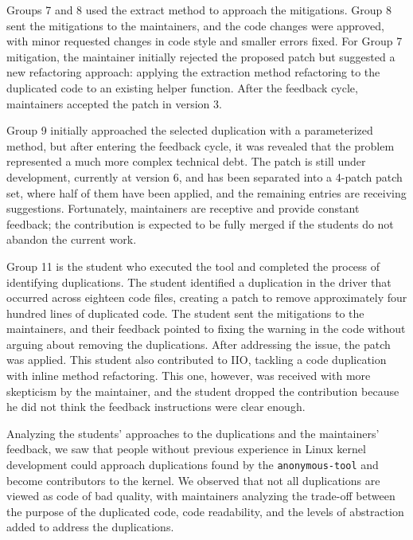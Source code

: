 \documentclass[10pt,conference]{IEEEtran}
\begin{document}

Groups 7 and 8 used the extract method to approach the mitigations. Group 8 sent the mitigations to the maintainers, and the code changes were approved, with minor requested changes in code style and smaller errors fixed. For Group 7 mitigation, the maintainer initially rejected the proposed patch but suggested a new refactoring approach: applying the extraction method refactoring to the duplicated code to an existing helper function. After the feedback cycle, maintainers accepted the patch in version 3.

Group 9 initially approached the selected duplication with a parameterized method, but after entering the feedback cycle, it was revealed that the problem represented a much more complex technical debt. The patch is still under development, currently at version 6, and has been separated into a 4-patch patch set, where half of them have been applied, and the remaining entries are receiving suggestions. Fortunately, maintainers are receptive and provide constant feedback; the contribution is expected to be fully merged if the students do not abandon the current work.

Group 11 is the student who executed the tool and completed the process of identifying duplications. The student identified a duplication in the driver that occurred across eighteen code files, creating a patch to remove approximately four hundred lines of duplicated code. The student sent the mitigations to the maintainers, and their feedback pointed to fixing the warning in the code without arguing about removing the duplications. After addressing the issue, the patch was applied. This student also contributed to IIO, tackling a code duplication with inline method refactoring. This one, however, was received with more skepticism by the maintainer, and the student dropped the contribution because he did not think the feedback instructions were clear enough.

Analyzing the students' approaches to the duplications and the maintainers' feedback, we saw that people without previous experience in Linux kernel development could approach duplications found by the \texttt{anonymous-tool} and become contributors to the kernel. We observed that not all duplications 
are viewed as code of bad quality, with maintainers analyzing the trade-off between the purpose of the duplicated code, code readability, and the levels of abstraction added to address the duplications.
\end{document}
